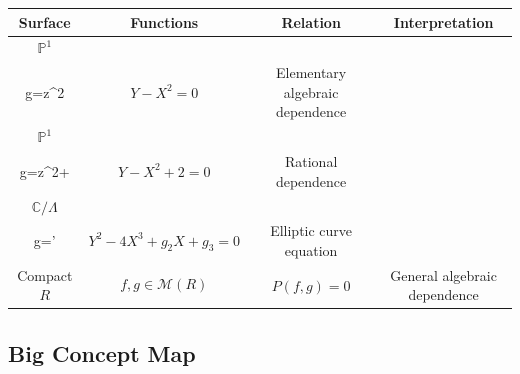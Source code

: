 \documentclass[12pt,a4paper]{article}
\theoremstyle{notespace}
\begin{document}
\begin{center}
	\renewcommand{\arraystretch}{1.45}
	\begin{tabular}{|c|c|c|c|}
		\hline
		\rowcolor{blue!15}
		Surface & Functions & Relation & Interpretation \\
		\hline
		
		\(\mathbb P^1\)
		&
		\(\begin{array}{c}
			f=z\\
			g=z^2
		\end{array}\)
		&
		\(Y-X^2=0\)
		&
		Elementary algebraic dependence
		\\
		\hline
		
		\(\mathbb P^1\)
		&
		\(\begin{array}{c}
			f=z+\frac1z\\
			g=z^2+\frac1{z^2}
		\end{array}\)
		&
		\(Y-X^2+2=0\)
		&
		Rational dependence
		\\
		\hline
		
		\(\mathbb C/\Lambda\)
		&
		\(\begin{array}{c}
			f=\wp\\
			g=\wp'
		\end{array}\)
		&
		\(Y^2-4X^3+g_2X+g_3=0\)
		&
		Elliptic curve equation
		\\
		\hline
		
		Compact \(R\)
		&
		\(\begin{array}{c}
			f,g\in\mathcal M(R)
		\end{array}\)
		&
		\(P(f,g)=0\)
		&
		General algebraic dependence
		\\
		\hline
		
	\end{tabular}
\end{center}

\subsection{Big Concept Map}
\end{document}

